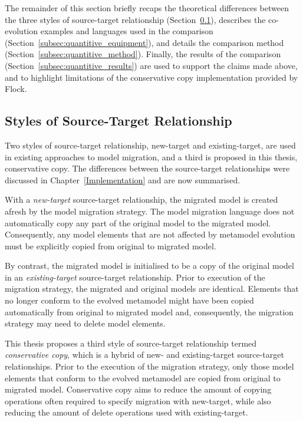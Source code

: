 The remainder of this section briefly recaps the theoretical differences between the three styles of source-target relationship (Section~\ref{subsec:styles_of_source-target_relationship}), describes the co-evolution examples and languages used in the comparison (Section~\ref{subsec:quantitive_equipment}), and details the comparison method (Section~\ref{subsec:quantitive_method}). Finally, the results of the comparison (Section~\ref{subsec:quantitive_results}) are used to support the claims made above, and to highlight limitations of the conservative copy implementation provided by Flock.


\subsection{Styles of Source-Target Relationship}
\label{subsec:styles_of_source-target_relationship}
Two styles of source-target relationship, new-target and existing-target, are used in existing approaches to model migration, and a third is proposed in this thesis, conservative copy. The differences between the source-target relationships were discussed in Chapter~\ref{Implementation} and are now summarised.

With a \emph{new-target} source-target relationship, the migrated model is created afresh by the model migration strategy. The model migration language does not automatically copy any part of the original model to the migrated model. Consequently, any model elements that are not affected by metamodel evolution must be explicitly copied from original to migrated model.

By contrast, the migrated model is initialised to be a copy of the original model in an \emph{existing-target} source-target relationship. Prior to execution of the migration strategy, the migrated and original models are identical. Elements that no longer conform to the evolved metamodel might have been copied automatically from original to migrated model and, consequently, the migration strategy may need to delete model elements.

This thesis proposes a third style of source-target relationship termed \emph{conservative copy}, which is a hybrid of new- and existing-target source-target relationships. Prior to the execution of the migration strategy, only those model elements that conform to the evolved metamodel are copied from original to migrated model. Conservative copy aims to reduce the amount of copying operations often required to specify migration with new-target, while also reducing the amount of delete operations used with existing-target.


